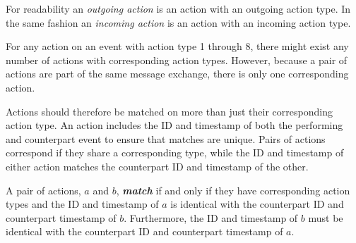 	\noindent For readability an \textit{outgoing action} is an action with an outgoing action type. In the same fashion an \textit{incoming action} is an action with an incoming action type.
	
	\newpar For any action on an event with action type 1 through 8, there might exist any number of actions with corresponding action types. However, because a pair of actions are part of the same message exchange, there is only one corresponding action.
	
	Actions should therefore be matched on more than just their corresponding action type. An action includes the ID and timestamp of both the performing and counterpart  event to ensure that matches are unique.
    Pairs of actions correspond if they share a corresponding type, while the ID and timestamp of either action matches the counterpart ID and timestamp of the other.
    
    \begin{definition}
    	\label{def:action:matching}
    	A pair of actions, $a$ and $b$, \textit{\textbf{match}} if and only if they have corresponding action types and the ID and timestamp of $a$ is identical with the counterpart ID and counterpart timestamp of $b$. Furthermore, the ID and timestamp of $b$ must be identical with the counterpart ID and counterpart timestamp of $a$.
    \end{definition}
    

